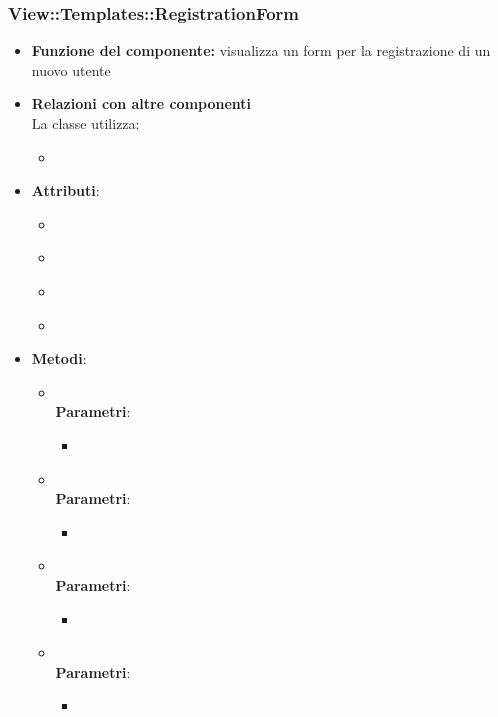  \subsubsection{View::Templates::RegistrationForm}
 \begin{itemize}
 \item\textbf{Funzione del componente:} visualizza un form per la registrazione di un nuovo utente
 \item\textbf{Relazioni con altre componenti}\\
 La classe utilizza:
 	\begin{itemize}
 		\item
 	\end{itemize}
 \item\textbf{Attributi}:
 	\begin{itemize}
 		\item\code{}\\
 		\item\code{}\\
 		\item\code{}\\
 		\item\code{}\\
 	\end{itemize}
 \item\textbf{Metodi}:
 	\begin{itemize}
 		\item\code{}\\
 		\textbf{Parametri}:
 			\begin{itemize}
 				\item\code{}\\
 			\end{itemize}
 		\item\code{}\\
 		\textbf{Parametri}:
 			\begin{itemize}
 				\item\code{}\\
 			\end{itemize}
 		\item\code{}\\
 		\textbf{Parametri}:
 			\begin{itemize}
 				\item\code{}\\
 			\end{itemize}
 		\item\code{}\\
 		\textbf{Parametri}:
 			\begin{itemize}
 				\item\code{}\\
 			\end{itemize}
 	\end{itemize}
 \end{itemize}
 
